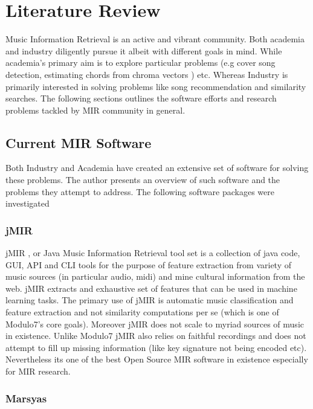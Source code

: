 $  $\chapter{Literature Review}

\noindent Music Information Retrieval is an active and vibrant community. Both academia and industry diligently pursue it albeit with different goals in mind. While academia's primary aim is to explore particular problems (e.g cover song detection, estimating chords from chroma vectors \cite{chord-detection} ) etc. Whereas Industry is primarily interested in solving problems like song recommendation and similarity searches. The following sections outlines the software efforts and research problems tackled by MIR community in general. 

\section{Current MIR Software}
\noindent Both Industry and Academia have created an extensive set of software for solving these problems. The author presents an overview of such software and the problems they attempt to address. The following software packages were investigated 

\subsection{jMIR}

\noindent jMIR  \cite{jMIR}, or Java Music Information Retrieval tool set is a collection of java code, GUI, API and CLI tools for the purpose of feature extraction from variety of music sources (in particular audio, midi) and mine cultural information from the web. jMIR extracts and exhaustive set of features that can be used in machine learning tasks. The primary use of jMIR is automatic music classification and feature extraction and not similarity computations per se (which is one of Modulo7's core goals). Moreover jMIR does not scale to myriad sources of music in existence. Unlike Modulo7 jMIR also relies on faithful recordings and does not attempt to fill up missing information (like key signature not being encoded etc). Nevertheless its one of the best Open Source MIR software in existence especially for MIR research. 

\subsection{Marsyas}

